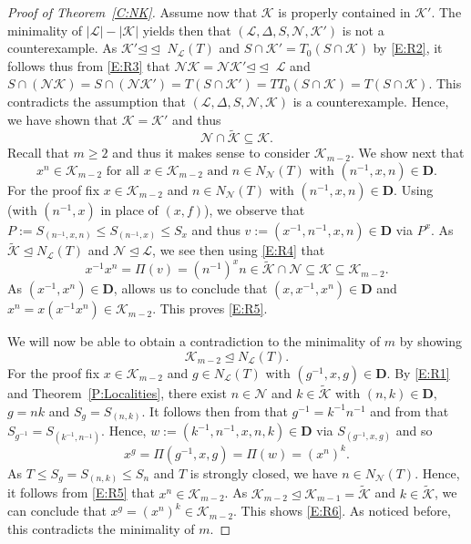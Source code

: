 \documentclass[reqno,11pt]{amsart}
\numberwithin{equation}{section}
\theoremstyle{definition}
\renewcommand{\L}{\mathcal{L}}
\newcommand{\tK}{\tilde{\mathcal{K}}}
\newcommand{\N}{\mathcal{N}}
\newcommand{\K}{\mathcal{K}}
\newcommand{\D}{\mathbf{D}}
\newcommand{\subn}{{\unlhd\!\unlhd\;}}
\begin{document}
\begin{proof}[Proof of Theorem~\ref{C:NK}]
\smallskip

Assume now that $\K$ is properly contained in $\K'$. The minimality of $|\L|-|\K|$ yields then that $(\L,\Delta,S,\N,\K')$ is not a counterexample. As $\K'\subn N_\L(T)$  and $S\cap \K'=T_0(S\cap\K)$ by \eqref{E:R2}, it follows thus from \eqref{E:R3} that $\N\K=\N\K'\subn\L$ and $S\cap (\N\K)=S\cap (\N\K')=T(S\cap\K')=TT_0(S\cap\K)=T(S\cap\K)$.  This contradicts the assumption that $(\L,\Delta,S,\N,\K)$ is a counterexample. Hence, we have shown that $\K=\K'$ and thus
\begin{equation}\label{E:R4}
 \N\cap\tK\subseteq\K.
\end{equation}
Recall that $m\geq 2$ and thus it makes sense to consider $\K_{m-2}$. We show next that
\begin{equation}\label{E:R5}
 x^n\in\K_{m-2}\mbox{ for all }x\in\K_{m-2}\mbox{ and }n\in N_\N(T)\mbox{ with }(n^{-1},x,n)\in\D.
\end{equation}
For the proof fix $x\in\K_{m-2}$ and $n\in N_\N(T)$ with $(n^{-1},x,n)\in\D$. Using \cite[Lemma~3.2(a)]{Chermak:2015} (with $(n^{-1},x)$ in place of $(x,f)$), we observe that  $P:=S_{(n^{-1},x,n)}\leq S_{(n^{-1},x)}\leq S_x$ and thus $v:=(x^{-1},n^{-1},x,n)\in\D$ via $P^x$. As $\tK\unlhd N_\L(T)$ and $\N\unlhd \L$, we see then using \eqref{E:R4} that
\[x^{-1}x^n=\Pi(v)=(n^{-1})^xn\in\tK\cap \N\subseteq\K\subseteq\K_{m-2}.\]
As $(x^{-1},x^n)\in\D$, \cite[Lemma~1.4(d)]{Chermak:2015} allows us to conclude that $(x,x^{-1},x^n)\in\D$ and $x^n=x(x^{-1}x^n)\in \K_{m-2}$. This proves \eqref{E:R5}.

\smallskip

We will now be able to obtain a contradiction to the minimality of $m$ by showing
\begin{equation}\label{E:R6}
 \K_{m-2}\unlhd N_\L(T).
\end{equation}
For the proof fix $x\in \K_{m-2}$ and $g\in N_\L(T)$ with $(g^{-1},x,g)\in\D$. By \eqref{E:R1} and Theorem~\ref{P:Localities}, there exist $n\in\N$ and $k\in\tK$ with $(n,k)\in\D$, $g=nk$ and $S_g=S_{(n,k)}$. It follows then from \cite[Lemma~1.4(f)]{Chermak:2015} that $g^{-1}=k^{-1}n^{-1}$ and from \cite[Lemma~2.3(c), Proposition~2.5(b)]{Chermak:2015} that $S_{g^{-1}}=S_{(k^{-1},n^{-1})}$. Hence, $w:=(k^{-1},n^{-1},x,n,k)\in\D$ via $S_{(g^{-1},x,g)}$ and so
\[x^g=\Pi(g^{-1},x,g)=\Pi(w)=(x^n)^k.\]
As $T\leq S_g=S_{(n,k)}\leq S_n$ and $T$ is strongly closed, we have $n\in N_\N(T)$. Hence, it follows from \eqref{E:R5} that $x^n\in\K_{m-2}$. As $\K_{m-2}\unlhd \K_{m-1}=\tK$ and $k\in\tK$, we can conclude that $x^g=(x^n)^k\in\K_{m-2}$. This shows \eqref{E:R6}. As noticed before, this  contradicts the minimality of $m$.
\end{proof}
\end{document}
